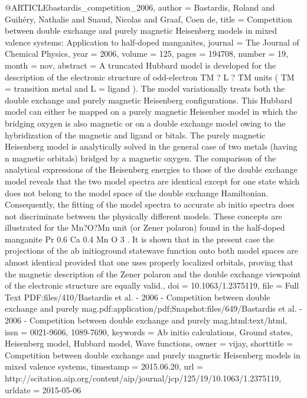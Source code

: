 @ARTICLE{bastardis_competition_2006,
  author = {Bastardis, Roland and Guihéry, Nathalie and Suaud, Nicolas and Graaf,
	Coen de},
  title = {Competition between double exchange and purely magnetic {Heisenberg}
	models in mixed valence systems: {Application} to half-doped manganites},
  journal = {The Journal of Chemical Physics},
  year = {2006},
  volume = {125},
  pages = {194708},
  number = {19},
  month = nov,
  abstract = {A truncated Hubbard model is developed for the description of the
	electronic structure of odd-electron TM ? L ? TM units ( TM = transition
	metal and L = ligand ). The model variationally treats both the double
	exchange and purely magnetic Heisenberg configurations. This Hubbard
	model can either be mapped on a purely magnetic Heisenber model in
	which the bridging oxygen is also magnetic or on a double exchange
	model owing to the hybridization of the magnetic and ligand or bitals.
	The purely magnetic Heisenberg model is analytically solved in the
	general case of two metals (having n magnetic orbitals) bridged by
	a magnetic oxygen. The comparison of the analytical expressions of
	the Heisenberg energies to those of the double exchange model reveals
	that the two model spectra are identical except for one state which
	does not belong to the model space of the double exchange Hamiltonian.
	Consequently, the fitting of the model spectra to accurate ab initio
	spectra does not discriminate between the physically different models.
	These concepts are illustrated for the Mn?O?Mn unit (or Zener polaron)
	found in the half-doped manganite Pr 0.6 Ca 0.4 Mn O 3 . It is shown
	that in the present case the projections of the ab initioground statewave
	function onto both model spaces are almost identical provided that
	one uses properly localized orbitals, proving that the magnetic description
	of the Zener polaron and the double exchange viewpoint of the electronic
	structure are equally valid.},
  doi = {10.1063/1.2375119},
  file = {Full Text PDF:files/410/Bastardis et al. - 2006 - Competition between double exchange and purely mag.pdf:application/pdf;Snapshot:files/649/Bastardis et al. - 2006 - Competition between double exchange and purely mag.html:text/html},
  issn = {0021-9606, 1089-7690},
  keywords = {Ab initio calculations, Ground states, Heisenberg model, Hubbard model,
	Wave functions},
  owner = {vijay},
  shorttitle = {Competition between double exchange and purely magnetic {Heisenberg}
	models in mixed valence systems},
  timestamp = {2015.06.20},
  url = {http://scitation.aip.org/content/aip/journal/jcp/125/19/10.1063/1.2375119},
  urldate = {2015-05-06}
}

